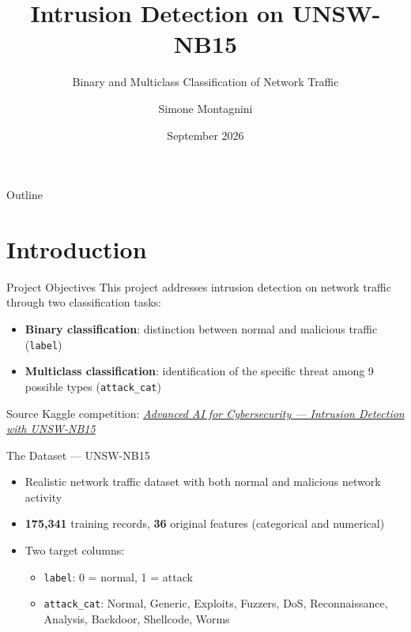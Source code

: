 \documentclass{beamer}
\title{Intrusion Detection on UNSW-NB15}
\subtitle{Binary and Multiclass Classification of Network Traffic}
\author{Simone Montagnini}
\institute{University of Bologna}
\date{September 2026}
\begin{document}
\frame{\titlepage}

\begin{frame}{Outline}
  \tableofcontents
\end{frame}

\section{Introduction}

\begin{frame}{Project Objectives}
  This project addresses intrusion detection on network traffic through two
  classification tasks:
  \begin{itemize}
    \item \textbf{Binary classification}: distinction between normal and malicious traffic
      (\texttt{label})
    \item \textbf{Multiclass classification}: identification of the specific threat among 9 possible types
      (\texttt{attack\_cat})
  \end{itemize}
  \vspace{0.5cm}
  \begin{block}{Source}
  Kaggle competition: \href{https://www.kaggle.com/competitions/advanced-ai-for-cybersecurity-intrusion-detection-with-unsw-nb-15/overview}{\textit{Advanced AI for Cybersecurity — Intrusion Detection with UNSW-NB15}}
  \end{block}
\end{frame}

\begin{frame}{The Dataset — UNSW-NB15}
  \begin{itemize}
    \item Realistic network traffic dataset with both normal and
      malicious network activity
    \item \textbf{175,341} training records, \textbf{36} original features
      (categorical and numerical)
    \item Two target columns:
      \begin{itemize}
        \item \texttt{label}: 0 = normal, 1 = attack
        \item \texttt{attack\_cat}: Normal, Generic, Exploits, Fuzzers, DoS,
          Reconnaissance, Analysis, Backdoor, Shellcode, Worms
      \end{itemize}
  \end{itemize}
\end{frame}
\end{document}

